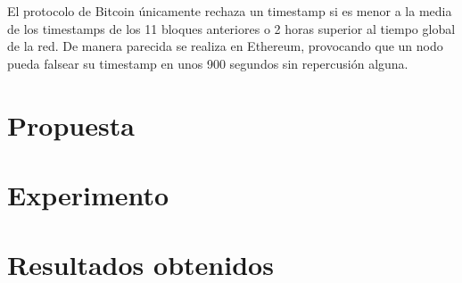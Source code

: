 El protocolo de Bitcoin únicamente rechaza un timestamp si es menor a la media de los timestamps de los 11 bloques anteriores o 2 horas superior al tiempo global de la red. De manera parecida se realiza en Ethereum, provocando que un nodo pueda falsear su timestamp en unos 900 segundos sin repercusión alguna.

\section{Propuesta}


\section{Experimento}


\section{Resultados obtenidos}

